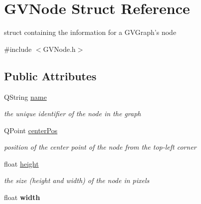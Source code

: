\hypertarget{structGVNode}{\section{G\+V\+Node Struct Reference}
\label{structGVNode}
}


struct containing the information for a G\+V\+Graph's node  




{\ttfamily \#include $<$G\+V\+Node.\+h$>$}

\subsection*{Public Attributes}
\begin{DoxyCompactItemize}
\item 
\hypertarget{structGVNode_ad1af9e7c14f0b580854ad3428f1b5c9d}{Q\+String \hyperlink{structGVNode_ad1af9e7c14f0b580854ad3428f1b5c9d}{name}}\label{structGVNode_ad1af9e7c14f0b580854ad3428f1b5c9d}

\begin{DoxyCompactList}\small\item\em the unique identifier of the node in the graph \end{DoxyCompactList}\item 
\hypertarget{structGVNode_a2ceb3d0e7d3f164710622acd3cbea6a6}{Q\+Point \hyperlink{structGVNode_a2ceb3d0e7d3f164710622acd3cbea6a6}{center\+Pos}}\label{structGVNode_a2ceb3d0e7d3f164710622acd3cbea6a6}

\begin{DoxyCompactList}\small\item\em position of the center point of the node from the top-\/left corner \end{DoxyCompactList}\item 
\hypertarget{structGVNode_a498e3f749e2228709a3987ac11512c82}{float \hyperlink{structGVNode_a498e3f749e2228709a3987ac11512c82}{height}}\label{structGVNode_a498e3f749e2228709a3987ac11512c82}

\begin{DoxyCompactList}\small\item\em the size (height and width) of the node in pixels \end{DoxyCompactList}\item 
\hypertarget{structGVNode_adc1d840d0813610c08420ce97195b893}{float {\bfseries width}}\label{structGVNode_adc1d840d0813610c08420ce97195b893}

\end{DoxyCompactItemize}


